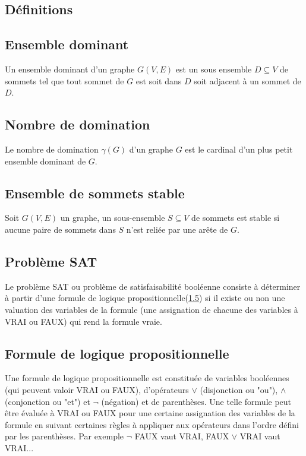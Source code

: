 \begin{appendix}
\section{Définitions}
\subsection{Ensemble dominant}
\label{def:ensemble_dominant}
Un ensemble dominant d'un graphe $G(V, E)$ est un sous ensemble $D \subseteq V$ de sommets tel que tout sommet de $G$ est soit dans $D$ soit adjacent à un sommet de $D$.

\subsection{Nombre de domination}
\label{def:nombre_de_domination}
Le nombre de domination $\gamma(G)$ d'un graphe $G$ est le cardinal d'un plus petit ensemble dominant de $G$.

\subsection{Ensemble de sommets stable}
\label{def:ensemble_de_sommets_stable}
Soit $G(V, E)$ un graphe, un sous-ensemble $S \subseteq V$ de sommets est stable si aucune paire de sommets dans $S$ n'est reliée par une arête de $G$.

\subsection{Problème SAT}
\label{def:SAT}
Le problème SAT ou problème de satisfaisabilité booléenne consiste à déterminer à partir d'une formule de logique propositionnelle(\ref{def:formule_de_logique_propositionnelle}) si il existe ou non une valuation des variables de la formule (une assignation de chacune des variables à VRAI ou FAUX) qui rend la formule vraie.

\subsection{Formule de logique propositionnelle}
\label{def:formule_de_logique_propositionnelle}
Une formule de logique propositionnelle est constituée de variables booléennes (qui peuvent valoir VRAI ou FAUX), d'opérateurs $\vee$ (disjonction ou "ou"), $\wedge$ (conjonction ou "et") et $\neg$ (négation) et de parenthèses. Une telle formule peut être évaluée à VRAI ou FAUX pour une certaine assignation des variables de la formule en suivant certaines règles à appliquer aux opérateurs dans l'ordre défini par les parenthèses. Par exemple $\neg$ FAUX vaut VRAI, FAUX $\vee$ VRAI vaut VRAI...


\end{appendix}
